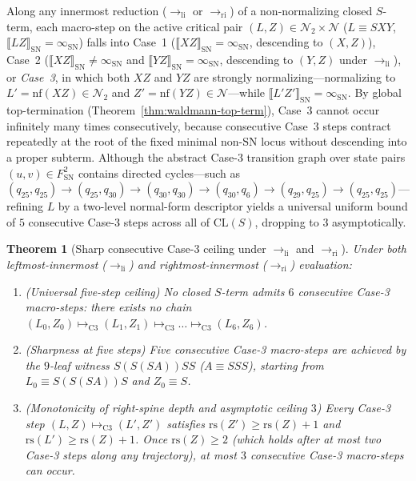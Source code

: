 \documentclass[11pt,reqno]{amsart}
\numberwithin{equation}{section}
\theoremstyle{plain}
\newtheorem{theorem}{Theorem}[section]
\theoremstyle{definition}
\theoremstyle{remark}
\begin{document}
Along any innermost reduction ($\to_{\mathrm{li}}$ or $\to_{\mathrm{ri}}$) of a non-normalizing closed $S$-term, each macro-step on the active critical pair $(L, Z) \in \mathcal{N}_2 \times \mathcal{N}$ ($L \equiv S X Y$, $\llbracket L Z \rrbracket_{\mathrm{SN}} = \infty_{\mathrm{SN}}$) falls into Case~1 ($\llbracket X Z \rrbracket_{\mathrm{SN}} = \infty_{\mathrm{SN}}$, descending to $(X, Z)$), Case~2 ($\llbracket X Z \rrbracket_{\mathrm{SN}} \neq \infty_{\mathrm{SN}}$ and $\llbracket Y Z \rrbracket_{\mathrm{SN}} = \infty_{\mathrm{SN}}$, descending to $(Y, Z)$ under $\to_{\mathrm{li}}$), or \emph{Case~3}, in which both $X Z$ and $Y Z$ are strongly normalizing---normalizing to $L' = \mathrm{nf}(X Z) \in \mathcal{N}_2$ and $Z' = \mathrm{nf}(Y Z) \in \mathcal{N}$---while $\llbracket L' Z' \rrbracket_{\mathrm{SN}} = \infty_{\mathrm{SN}}$. By global top-termination (Theorem~\ref{thm:waldmann-top-term}), Case~3 cannot occur infinitely many times consecutively, because consecutive Case~3 steps contract repeatedly at the root of the fixed minimal non-$\mathrm{SN}$ locus without descending into a proper subterm. Although the abstract Case-3 transition graph over state pairs $(u, v) \in F_{\mathrm{SN}}^2$ contains directed cycles---such as $(q_{25}, q_{25}) \to (q_{25}, q_{30}) \to (q_{30}, q_{30}) \to (q_{30}, q_6) \to (q_{29}, q_{25}) \to (q_{25}, q_{25})$---refining $L$ by a two-level normal-form descriptor yields a universal uniform bound of $5$ consecutive Case-3 steps across all of $\mathrm{CL}(S)$, dropping to $3$ asymptotically.

\begin{theorem}[Sharp consecutive Case-3 ceiling under $\to_{\mathrm{li}}$ and $\to_{\mathrm{ri}}$]
\label{thm:case3-ceiling}
Under both leftmost-innermost ($\to_{\mathrm{li}}$) and rightmost-innermost ($\to_{\mathrm{ri}}$) evaluation:
\begin{enumerate}[label=(\roman*)]
\item \emph{(Universal five-step ceiling)} No closed $S$-term admits $6$ consecutive Case-3 macro-steps: there exists no chain $(L_0, Z_0) \mapsto_{\mathrm{C3}} (L_1, Z_1) \mapsto_{\mathrm{C3}} \dots \mapsto_{\mathrm{C3}} (L_6, Z_6)$.
\item \emph{(Sharpness at five steps)} Five consecutive Case-3 macro-steps are achieved by the $9$-leaf witness $S(S(S A)) S S$ ($A \equiv S S S$), starting from $L_0 \equiv S(S(S A)) S$ and $Z_0 \equiv S$.
\item \emph{(Monotonicity of right-spine depth and asymptotic ceiling $3$)} Every Case-3 step $(L, Z) \mapsto_{\mathrm{C3}} (L', Z')$ satisfies $\mathrm{rs}(Z') \ge \mathrm{rs}(Z) + 1$ and $\mathrm{rs}(L') \ge \mathrm{rs}(Z) + 1$. Once $\mathrm{rs}(Z) \ge 2$ (which holds after at most two Case-3 steps along any trajectory), at most $3$ consecutive Case-3 macro-steps can occur.
\end{enumerate}
\end{theorem}
\end{document}
